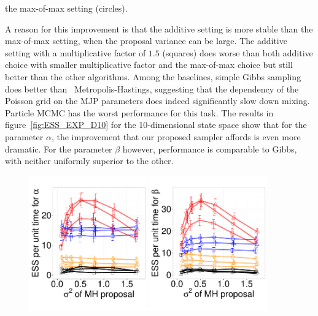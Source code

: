  the {max-of-max} setting (circles). {A reason for this improvement is 
  that the additive setting is more stable than the max-of-max setting, when the 
proposal variance can be large. The {additive setting with a multiplicative factor 
of $1.5$} (squares) does worse than both {additive choice with smaller multiplicative
factor and the max-of-max choice} but still better than the other algorithms. Among 
the baselines, simple Gibbs sampling 
does better than \naive\ Metropolis-Hastings, suggesting that the dependency of 
the Poisson grid on the MJP parameters does indeed significantly slow 
down mixing. Particle MCMC has the worst performance for this task. The
results in figure~\ref{fig:ESS_EXP_D10} for the 10-dimensional state space
show that for the parameter $\alpha$, the improvement that our proposed
sampler affords is even more dramatic. For the parameter $\beta$ however,
performance is comparable to Gibbs, %
with neither uniformly superior to the other.
  \begin{figure}[H]
  \centering
  \begin{minipage}[!hp]{0.99\linewidth}
  \centering
  \begin{minipage}[!hp]{0.99\linewidth}
    \includegraphics [width=0.45\textwidth, angle=0]{figs/exp_3_alpha.pdf}
    \includegraphics [width=0.45\textwidth, angle=0]{figs/exp_3_beta.pdf}

\end{minipage}
\end{minipage}
\end{figure}}
